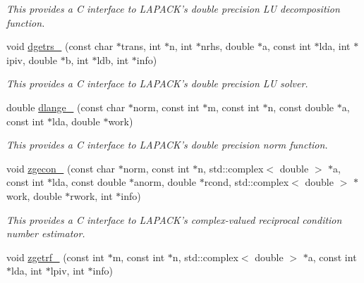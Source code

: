\begin{DoxyCompactItemize}
\begin{DoxyCompactList}\small\item\em This provides a C interface to L\-A\-P\-A\-C\-K's double precision L\-U decomposition function. \end{DoxyCompactList}\item 
\hypertarget{namespacekeycpp_ab9c33788a2c083aa5738eda1fe62a261}{void \hyperlink{namespacekeycpp_ab9c33788a2c083aa5738eda1fe62a261}{dgetrs\-\_\-} (const char $\ast$trans, int $\ast$n, int $\ast$nrhs, double $\ast$a, const int $\ast$lda, int $\ast$ipiv, double $\ast$b, int $\ast$ldb, int $\ast$info)}\label{namespacekeycpp_ab9c33788a2c083aa5738eda1fe62a261}

\begin{DoxyCompactList}\small\item\em This provides a C interface to L\-A\-P\-A\-C\-K's double precision L\-U solver. \end{DoxyCompactList}\item 
\hypertarget{namespacekeycpp_a4507ef954be960fec70ca0f93258d730}{double \hyperlink{namespacekeycpp_a4507ef954be960fec70ca0f93258d730}{dlange\-\_\-} (const char $\ast$norm, const int $\ast$m, const int $\ast$n, const double $\ast$a, const int $\ast$lda, double $\ast$work)}\label{namespacekeycpp_a4507ef954be960fec70ca0f93258d730}

\begin{DoxyCompactList}\small\item\em This provides a C interface to L\-A\-P\-A\-C\-K's double precision norm function. \end{DoxyCompactList}\item 
\hypertarget{namespacekeycpp_a444e3cdc7e7929414370b6b50ea1218c}{void \hyperlink{namespacekeycpp_a444e3cdc7e7929414370b6b50ea1218c}{zgecon\-\_\-} (const char $\ast$norm, const int $\ast$n, std\-::complex$<$ double $>$ $\ast$a, const int $\ast$lda, const double $\ast$anorm, double $\ast$rcond, std\-::complex$<$ double $>$ $\ast$work, double $\ast$rwork, int $\ast$info)}\label{namespacekeycpp_a444e3cdc7e7929414370b6b50ea1218c}

\begin{DoxyCompactList}\small\item\em This provides a C interface to L\-A\-P\-A\-C\-K's complex-\/valued reciprocal condition number estimator. \end{DoxyCompactList}\item 
\hypertarget{namespacekeycpp_ab18d58d53d8e19a37d74d24da27a64dd}{void \hyperlink{namespacekeycpp_ab18d58d53d8e19a37d74d24da27a64dd}{zgetrf\-\_\-} (const int $\ast$m, const int $\ast$n, std\-::complex$<$ double $>$ $\ast$a, const int $\ast$lda, int $\ast$lpiv, int $\ast$info)}\label{namespacekeycpp_ab18d58d53d8e19a37d74d24da27a64dd}


\end{DoxyCompactItemize}
